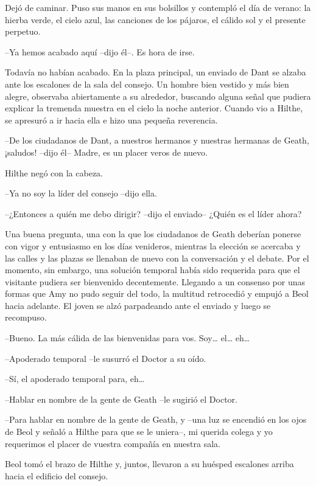 {Dejó de caminar. Puso sus manos en sus bolsillos y contempló el día de
	verano: la hierba verde, el cielo azul, las canciones de los pájaros, el
cálido sol y el presente perpetuo.}

{--Ya hemos acabado aquí --dijo él--. Es hora de irse.}

\mbox{}

{Todavía no habían acabado. En la plaza principal, un enviado de Dant se
	alzaba ante los escalones de la sala del consejo. Un hombre bien vestido
	y más bien alegre, observaba abiertamente a su alrededor, buscando
	alguna señal que pudiera explicar la tremenda muestra en el cielo la
	noche anterior. Cuando vio a Hilthe, se apresuró a ir hacia ella e hizo
una pequeña reverencia.}

{--De los ciudadanos de Dant, a nuestros hermanos y nuestras hermanas
de Geath, ¡saludos! --dijo él-- Madre, es un placer veros de nuevo.}

{Hilthe negó con la cabeza.}

{--Ya no soy la líder del consejo --dijo ella.}

{--¿Entonces a quién me debo dirigir? --dijo el enviado-- ¿Quién es el
líder ahora?}

{Una buena pregunta, una con la que los ciudadanos de Geath deberían
	ponerse con vigor y entusiasmo en los días venideros, mientras la
	elección se acercaba y las calles y las plazas se llenaban de nuevo con
	la conversación y el debate. Por el momento, sin embargo, una solución
	temporal había sido requerida para que el visitante pudiera ser
	bienvenido decentemente. Llegando a un consenso por unas formas que Amy
	no pudo seguir del todo, la multitud retrocedió y empujó a Beol hacia
	adelante. El joven se alzó parpadeando ante el enviado y luego se
recompuso.}

{--Bueno. La más cálida de las bienvenidas para vos. Soy\ldots{}
	el\ldots{} eh\ldots{}}

{--Apoderado temporal --le susurró el Doctor a su oído.}

{--Sí, el apoderado temporal para, eh\ldots{}}

{--Hablar en nombre de la gente de Geath --le sugirió el Doctor.}

{--Para hablar en nombre de la gente de Geath, y --una luz se encendió
	en los ojos de Beol y señaló a Hilthe para que se le uniera--, mi
	querida colega y yo requerimos el placer de vuestra compañía en nuestra
sala.}

{Beol tomó el brazo de Hilthe y, juntos, llevaron a su huésped escalones
arriba hacia el edificio del consejo.}

